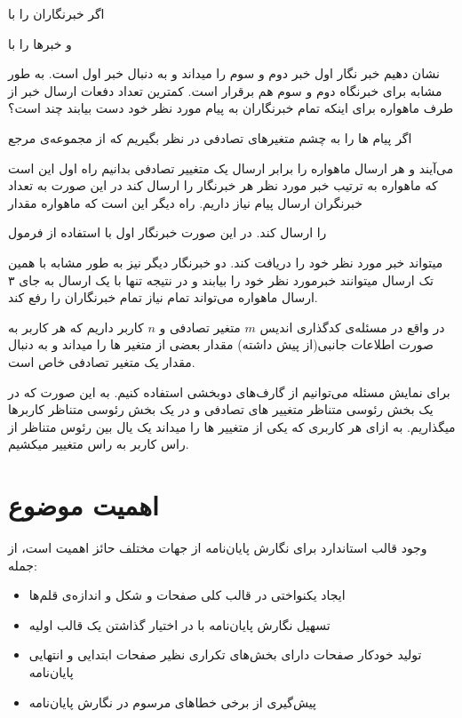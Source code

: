  اگر خبرنگاران را با

و خبرها را با

نشان دهیم خبر نگار اول خبر دوم و سوم را میداند و به دنبال خبر اول است. به طور مشابه برای خبرنگاه دوم و سوم هم برقرار است.
کمترین تعداد دفعات ارسال خبر از طرف ماهواره برای اینکه تمام خبرنگاران به پیام مورد نظر خود دست بیابند چند است؟

اگر پیام ها را به چشم متغیرهای تصادفی در نظر بگیریم که از مجموعه‌ی مرجع

می‌آیند و هر ارسال ماهواره را برابر ارسال یک متغییر تصادفی بدانیم راه اول این است که ماهواره به ترتیب خبر مورد نظر هر خبرنگار را ارسال کند در این صورت به تعداد خبرنگران ارسال پیام نیاز داریم.
راه دیگر این است که ماهواره مقدار

را ارسال کند. در این صورت خبرنگار اول با استفاده از فرمول

میتواند خبر مورد نظر خود را دریافت کند. دو خبرنگار دیگر نیز به طور مشابه با همین تک ارسال میتوانند خبرمورد نظر خود را بیابند و در نتیجه تنها با یک ارسال به جای ۳ ارسال ماهواره می‌تواند تمام نیاز تمام خبرنگاران را رفع کند.

در واقع در مسئله‌ی کدگذاری اندیس
$m$
متغیر تصادفی و
$n$
کاربر داریم که هر کاربر به صورت اطلاعات جانبی(از پیش داشته) مقدار بعضی از متغیر ها را میداند و به دنبال مقدار یک متغیر تصادفی خاص است.

برای نمایش مسئله می‌توانیم از گارف‌های دوبخشی استفاده کنیم. به این صورت که در یک بخش رئوسی متناظر متغییر های تصادفی و در یک بخش رئوسی متناظر کاربرها میگذاریم. به ازای هر کاربری که یکی از متغییر ها را میداند یک یال بین رئوس متناظر از راس کاربر به راس متغییر میکشیم.



\section{اهمیت موضوع}

وجود قالب استاندارد برای نگارش پایان‌نامه از جهات مختلف حائز اهمیت است، از جمله:

\begin{itemize}
\item ایجاد یکنواختی در قالب کلی صفحات و شکل و اندازه‌ی قلم‌ها
\item تسهیل نگارش پایان‌نامه با در اختیار گذاشتن یک قالب اولیه
\item تولید خودکار صفحات دارای بخش‌های تکراری نظیر صفحات ابتدایی و انتهایی پایان‌نامه
\item پیش‌گیری از برخی خطاهای مرسوم در نگارش پایان‌نامه
\end{itemize}

